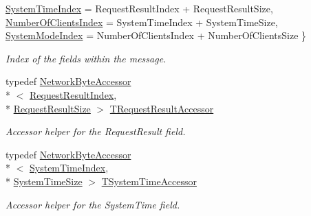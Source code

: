 \begin{DoxyCompactItemize}
\hyperlink{class_terra_swarm_1_1_asynchronous_1_1_client_connection_response_a696e860584893543721be9624b7114fca24610af2c75e9f00dd1a1bb759c1bcb8}{System\-Time\-Index} = Request\-Result\-Index + Request\-Result\-Size, 
\hyperlink{class_terra_swarm_1_1_asynchronous_1_1_client_connection_response_a696e860584893543721be9624b7114fca00327ef493fd38258f86303295b076e3}{Number\-Of\-Clients\-Index} = System\-Time\-Index + System\-Time\-Size, 
\hyperlink{class_terra_swarm_1_1_asynchronous_1_1_client_connection_response_a696e860584893543721be9624b7114fcaab080fba23b3393ae7737f430dcfe830}{System\-Mode\-Index} = Number\-Of\-Clients\-Index + Number\-Of\-Clients\-Size
 \}
\begin{DoxyCompactList}\small\item\em Index of the fields within the message. \end{DoxyCompactList}\item 
typedef \hyperlink{class_terra_swarm_1_1_network_byte_accessor}{Network\-Byte\-Accessor}\\*
$<$ \hyperlink{class_terra_swarm_1_1_asynchronous_1_1_client_connection_response_a696e860584893543721be9624b7114fca29bcb52c78bd4915167362f6f59ce536}{Request\-Result\-Index}, \\*
\hyperlink{class_terra_swarm_1_1_asynchronous_1_1_client_connection_response_a059519ab548bdfbe546b4583c5174fe1ad21e0ac9ec91fa55bf9ba9f4881872cf}{Request\-Result\-Size} $>$ \hyperlink{class_terra_swarm_1_1_asynchronous_1_1_client_connection_response_a43af70d1b67752224dd262c6fdd31a7e}{T\-Request\-Result\-Accessor}
\begin{DoxyCompactList}\small\item\em Accessor helper for the Request\-Result field. \end{DoxyCompactList}\item 
typedef \hyperlink{class_terra_swarm_1_1_network_byte_accessor}{Network\-Byte\-Accessor}\\*
$<$ \hyperlink{class_terra_swarm_1_1_asynchronous_1_1_client_connection_response_a696e860584893543721be9624b7114fca24610af2c75e9f00dd1a1bb759c1bcb8}{System\-Time\-Index}, \\*
\hyperlink{class_terra_swarm_1_1_asynchronous_1_1_client_connection_response_a059519ab548bdfbe546b4583c5174fe1aebe21ab3228fd3367b5372237080e6af}{System\-Time\-Size} $>$ \hyperlink{class_terra_swarm_1_1_asynchronous_1_1_client_connection_response_a64cb8d4313a5d10fa85b3e0b692764bd}{T\-System\-Time\-Accessor}
\begin{DoxyCompactList}\small\item\em Accessor helper for the System\-Time field. \end{DoxyCompactList}\item 

\end{DoxyCompactItemize}
